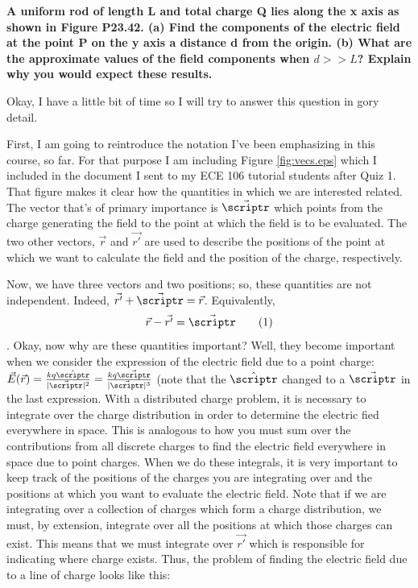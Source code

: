 \begin{homeworkProblem}[Problem 23.42]

\textbf{A uniform rod of length L and total charge Q lies along the x
axis as shown in Figure P23.42. (a) Find the components of the electric
field at the point P on the y axis a distance d from the origin. (b)
What are the approximate values of the field components when $d >>L$?
Explain why you would expect these results.}

Okay, I have a little bit of time so I will try to answer this question
in gory detail.

First, I am going to reintroduce the notation I've been emphasizing in
this course, so far. For that purpose I am including Figure
\ref{fig:vecs.eps} which I included in the document I sent to my ECE 106
tutorial students after Quiz 1. That figure makes it clear how the
quantities in which we are interested related. The vector that's of
primary importance is $\vec{\scriptr}$ which points from the charge
generating the field to the point at which the field is to be evaluated.
The two other vectors, $\vec{r}$ and $\vec{r'}$ are used to describe the
positions of the point at which we want to calculate the field and the
position of the charge, respectively.

Now, we have three vectors and two positions; so, these quantities are
not independent. Indeed, $\vec{r'}+\vec{\scriptr} = \vec{r}$.
Equivalently, \[\vec{r}-\vec{r'} = \vec{\scriptr} \addtag \]. Okay, now
why are these quantities important? Well, they become important when we
consider the expression of the electric field due to a point charge:
$\vec{E}(\vec{r}) = \frac{k q  \hat{\scriptr}}{|\vec{\scriptr}|^2} =
\frac{k q  \vec{\scriptr}}{|\vec{\scriptr}|^3}$ (note that the
$\hat{\scriptr}$ changed to a $\vec{\scriptr}$ in the last expression.
With a distributed charge problem, it is necessary to integrate over the
charge distribution in order to determine the electric fied everywhere
in space. This is analogous to how you must sum over the contributions
from all discrete charges to find the electric field everywhere in space
due to point charges. When we do these integrals, it is very important
to keep track of the positions of the charges you are integrating over
and the positions at which you want to evaluate the electric field. Note
that if we are integrating over a collection of charges which form a
charge distribution, we must, by extension, integrate over all the
positions at which those charges can exist. This means that we must
integrate over $\vec{r'}$ which is responsible for indicating where
charge exists. Thus, the problem of finding the electric field due to a
line of charge looks like this:


\end{homeworkProblem}
